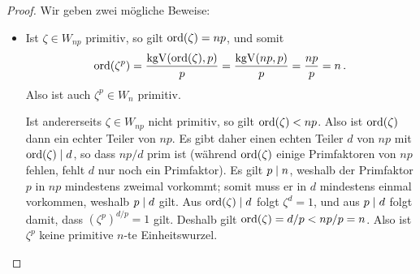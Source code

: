 \begin{proof}
  Wir geben zwei mögliche Beweise:
  \begin{itemize}
    \item
      Ist $\zeta \in W_{np}$ primitiv, so gilt $\operatorname{ord}(\zeta) = np$, und somit
      \[
          \operatorname{ord}(\zeta^p)
        = \frac{ \operatorname{kgV}(\operatorname{ord}(\zeta), p) }{p}
        = \frac{ \operatorname{kgV}(np, p) }{p}
        = \frac{ np }{ p }
        = n\,.
      \]
      Also ist auch $\zeta^p \in W_n$ primitiv.
      
      Ist andererseits $\zeta \in W_{np}$ nicht primitiv, so gilt $\operatorname{ord}(\zeta) < np$.
      Also ist $\operatorname{ord}(\zeta)$ dann ein echter Teiler von $np$.
      Es gibt daher einen echten Teiler $d$ von $np$ mit $\operatorname{ord}(\zeta) \mathrel{|} d$, so dass $np/d$ prim ist
      (während $\operatorname{ord}(\zeta)$ einige Primfaktoren von $np$ fehlen, fehlt $d$ nur noch ein Primfaktor).
      Es gilt $p \mathrel{|} n$, weshalb der Primfaktor $p$ in $np$ mindestens zweimal vorkommt;
      somit muss er in $d$ mindestens einmal vorkommen, weshalb $p \mathrel{|} d$ gilt.
      Aus $\operatorname{ord}(\zeta) \mathrel{|} d$ folgt $\zeta^d = 1$, und aus $p \mathrel{|} d$ folgt damit, dass $(\zeta^p)^{d/p} = 1$ gilt.
      Deshalb gilt $\operatorname{ord}(\zeta) = d/p < np/p = n$.
      Also ist $\zeta^p$ keine primitive $n$-te Einheitswurzel.
      

\end{itemize}
\end{proof}
